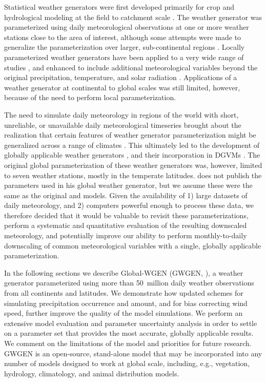 \documentclass[
11pt, %
english, %
singlespacing, %
headsepline, %
]{MastersDoctoralThesis} %
\begin{document}
\begin{NoHyper}
\begin{refsection}
Statistical weather generators were first developed primarily for crop and hydrological modeling at the field to catchment scale \citep{Richardson1981,WoolhiserPegram1979,WoolhiserRoldan1982}. The weather generator was parameterized using daily meteorological observations at one or more weather stations close to the area of interest, although some attempts were made to generalize the parameterization over larger, sub-continental regions \citep[e.g.,][]{Wilks1999a,Wilks1998,WoolhiserRoldan1986}. Locally parameterized weather generators have been applied to a very wide range of studies \citep{Wilks2010,WilksWilby1999}, and enhanced to include additional meteorological variables beyond the original precipitation, temperature, and solar radiation \citep[e.g.,][]{ParlangeKatz2000}. Applications of a weather generator at continental to global scales was still limited, however, because of the need to perform local parameterization.

The need to simulate daily meteorology in regions of the world with short, unreliable, or unavailable daily meteorological timeseries brought about the realization that certain features of weather generator parameterization might be generalized across a range of climates \citep{GengAuburn1987,GengDevriesSupit1986}. This ultimately led to the development of globally applicable weather generators \citep{Friend1998}, and their incorporation in DGVMs \citep{BondeauSmithZaehleEtAl2007,GertenSchaphoffHaberlandtEtAl2004,PfeifferSpessaKaplan2013}. The original global parameterization \citep{GengDevriesSupit1986} of these weather generators was, however, limited to seven weather stations, mostly in the temperate latitudes. \cite{Friend1998} does not publish the parameters used in his global weather generator, but we assume these were the same as the original \cite{GengAuburn1987} and \cite{GengDevriesSupit1986} models. Given the availability of 1) large datasets of daily meteorology, and 2) computers powerful enough to process these data, we therefore decided that it would be valuable to revisit these parameterizations, perform a systematic and quantitative evaluation of the resulting downscaled meteorology, and potentially improve our ability to perform monthly-to-daily downscaling of common meteorological variables with a single, globally applicable parameterization.

In the following sections we describe Global-WGEN (GWGEN, \cite{SommerKaplan2017b}), a weather generator parameterized using more than 50~million daily weather observations from all continents and latitudes. We demonstrate how updated schemes for simulating precipitation occurrence and amount, and for bias correcting wind speed, further improve the quality of the model simulations. We perform an extensive model evaluation and parameter uncertainty analysis in order to settle on a parameter set that provides the most accurate, globally applicable results. We comment on the limitations of the model and priorities for future research. GWGEN is an open-source, stand-alone model that may be incorporated into any number of models designed to work at global scale, including, e.g., vegetation, hydrology, climatology, and animal distribution models.



\end{refsection}
\end{NoHyper}
\end{document}
